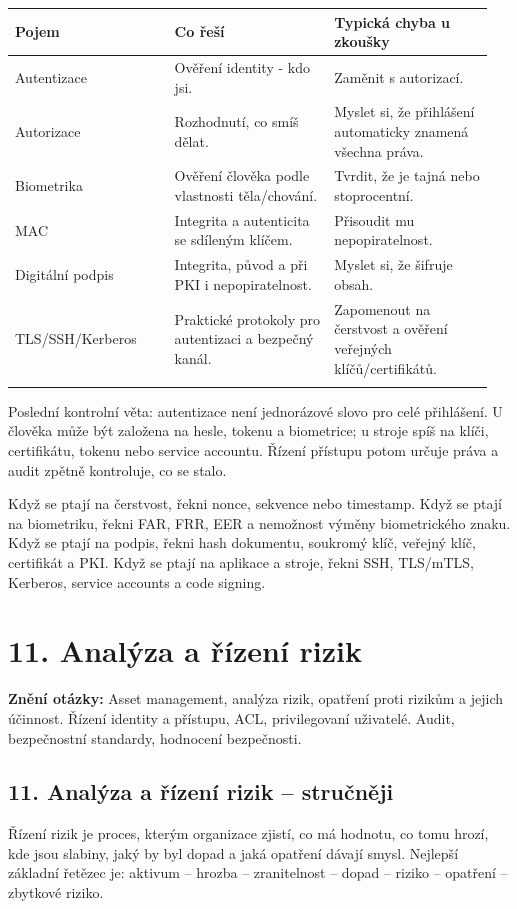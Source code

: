 \documentclass[11pt,a4paper]{article}
\newcommand{\otazka}[3]{\section*{#1}\addcontentsline{toc}{section}{#1}\noindent\textbf{Znění otázky:} #2\par\medskip}
\begin{document}
\begin{longtable}{p{0.317\linewidth}p{0.317\linewidth}p{0.317\linewidth}}
\toprule
\textbf{Pojem} & \textbf{Co řeší} & \textbf{Typická chyba u zkoušky} \\
\midrule\endhead
Autentizace & Ověření identity - kdo jsi. & Zaměnit s autorizací. \\
\addlinespace
Autorizace & Rozhodnutí, co smíš dělat. & Myslet si, že přihlášení automaticky znamená všechna práva. \\
\addlinespace
Biometrika & Ověření člověka podle vlastnosti těla/chování. & Tvrdit, že je tajná nebo stoprocentní. \\
\addlinespace
MAC & Integrita a autenticita se sdíleným klíčem. & Přisoudit mu nepopiratelnost. \\
\addlinespace
Digitální podpis & Integrita, původ a při PKI i nepopiratelnost. & Myslet si, že šifruje obsah. \\
\addlinespace
TLS/SSH/Kerberos & Praktické protokoly pro autentizaci a bezpečný kanál. & Zapomenout na čerstvost a ověření veřejných klíčů/certifikátů. \\
\addlinespace
\bottomrule
\end{longtable}

Poslední kontrolní věta: autentizace není jednorázové slovo pro celé přihlášení. U člověka může být založena na hesle, tokenu a biometrice; u stroje spíš na klíči, certifikátu, tokenu nebo service accountu. Řízení přístupu potom určuje práva a audit zpětně kontroluje, co se stalo.

Když se ptají na čerstvost, řekni nonce, sekvence nebo timestamp. Když se ptají na biometriku, řekni FAR, FRR, EER a nemožnost výměny biometrického znaku. Když se ptají na podpis, řekni hash dokumentu, soukromý klíč, veřejný klíč, certifikát a PKI. Když se ptají na aplikace a stroje, řekni SSH, TLS/mTLS, Kerberos, service accounts a code signing.

\newpage

\otazka{11. Analýza a řízení rizik}{Asset management, analýza rizik, opatření proti rizikům a jejich účinnost. Řízení identity a přístupu, ACL, privilegovaní uživatelé. Audit, bezpečnostní standardy, hodnocení bezpečnosti.}{PV080, PV157, PV017}

\subsection*{11. Analýza a řízení rizik -- stručněji}
Řízení rizik je proces, kterým organizace zjistí, co má hodnotu, co tomu hrozí, kde jsou slabiny, jaký by byl dopad a jaká opatření dávají smysl. Nejlepší základní řetězec je: aktivum -- hrozba -- zranitelnost -- dopad -- riziko -- opatření -- zbytkové riziko.
\end{document}
